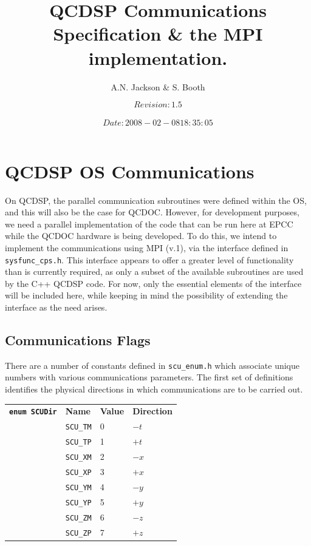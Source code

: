 \documentclass[12pt]{article}
\title{QCDSP Communications Specification \& the MPI implementation.}
\author{A.N. Jackson \& S. Booth}
\date{\mbox{\small $$Revision: 1.5 $$  $$Date: 2008-02-08 18:35:05 $$}}
\newcommand{\cde}[1]{{\tt #1}}            %
\begin{document}
\maketitle

\tableofcontents
\newpage

\section{QCDSP OS Communications}
On QCDSP, the parallel communication subroutines were defined within
the OS, and this will also be the case for QCDOC.  However, for
development purposes, we need a parallel implementation of the code
that can be run here at EPCC while the QCDOC hardware is being
developed.  To do this, we intend to implement the communications
using MPI (v.1), via the interface defined in \cde{sysfunc_cps.h}.  This
interface appears to offer a greater level of functionality than is
currently required, as only a subset of the available subroutines are
used by the C++ QCDSP code.  For now, only the essential elements of
the interface will be included here, while keeping in mind the
possibility of extending the interface as the need arises.

\subsection{Communications Flags}
\label{col:comm:flags}
There are a number of constants defined in \cde{scu\_enum.h} which
associate unique numbers with various communications parameters.  The
first set of definitions identifies the physical directions in which
communications are to be carried out.

\begin{tabular}{llll}
\cde{{\bf enum SCUDir}} & {\bf Name} & {\bf Value} & {\bf Direction} \\
                        &\cde{SCU\_\-TM} & 0 & $-t$\\
                        &\cde{SCU\_\-TP} & 1 & $+t$\\
                        &\cde{SCU\_\-XM} & 2 & $-x$\\
                        &\cde{SCU\_\-XP} & 3 & $+x$\\
                        &\cde{SCU\_\-YM} & 4 & $-y$\\
                        &\cde{SCU\_\-YP} & 5 & $+y$\\
                        &\cde{SCU\_\-ZM} & 6 & $-z$\\
                        &\cde{SCU\_\-ZP} & 7 & $+z$
\end{tabular}
\end{document}
